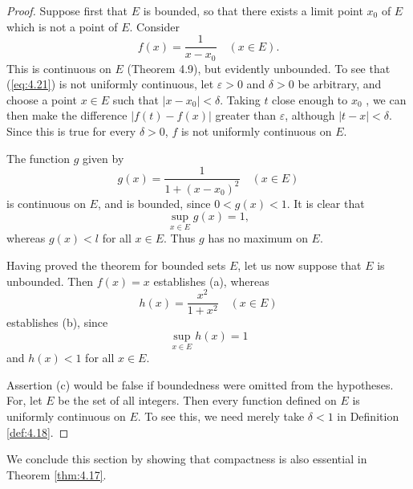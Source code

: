 \begin{proof}
    Suppose first that $E$ is bounded, 
    so that there exists a limit point $x_0$ of $E$ 
    which is not a point of $E$. 
    Consider
    \begin{equation}
        \label{eq:4.21}
        f(x) = \frac{1}{x - x_0}
        \quad
        (x \in E).
    \end{equation}
    This is continuous on $E$ (Theorem 4.9), but evidently unbounded. 
    To see that (\ref{eq:4.21}) is not uniformly continuous, 
    let $\varepsilon > 0$ and $\delta > 0$ be arbitrary, 
    and choose a point $x \in E$ such that $\left| x - x_0 \right| < \delta$.
    Taking $t$ close enough to $x_0$ , 
    we can then make the difference $\left| f(t) - f(x) \right|$ greater than $\varepsilon$, although $\left| t-x \right| < \delta$.
    Since this is true for every $\delta > 0$, 
    $f$ is not uniformly continuous on $E$.

    The function $g$ given by
    \begin{equation}
        \label{eq:4.22}
        g(x) = \frac{1}{1+(x-x_0)^2}
        \quad
        (x \in E)
    \end{equation}
    is continuous on $E$, and is bounded, since $0 < g(x) < 1$. 
    It is clear that 
    \begin{equation*}
        \sup_{x \in E} g(x) = 1,
    \end{equation*}
    whereas $g(x) < l$ for all $x \in E$. Thus $g$ has no maximum on $E$.

    Having proved the theorem for bounded sets $E$, 
    let us now suppose that $E$ is unbounded. 
    Then $f(x) = x$ establishes (a), whereas
    \begin{equation}
        \label{eq:4.23}
        h(x) = \frac{x^2}{1 + x^2}
        \quad 
        (x \in E)
    \end{equation}
    establishes (b), since
    \begin{equation*}
        \sup_{x \in E} h(x) = 1
    \end{equation*}
    and $h(x) < 1$ for all $x \in E$.

    Assertion (c) would be false if boundedness were omitted from the
    hypotheses. 
    For, let $E$ be the set of all integers. 
    Then every function defined on $E$ is uniformly continuous on $E$. 
    To see this, we need merely take $\delta < 1$ in Definition \ref{def:4.18}.
\end{proof}

We conclude this section by showing that compactness is also essential in
Theorem \ref{thm:4.17}.


